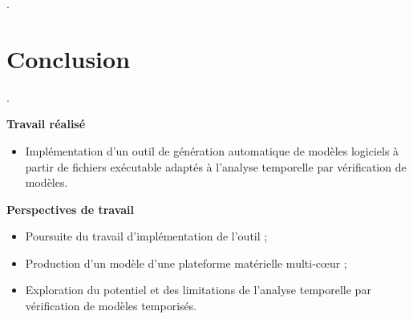 \documentclass[final]{beamer}
\begin{document}
\begin{frame}
\begin{textblock}{39}
\begin{block}{\thesection. \secname}
        \vspace{.4em}
      \end{block}
      \vspace{1em}
      
      \section{Conclusion}
      \begin{block}{\thesection. \secname}

        \textbf{Travail réalisé}
        \begin{itemize}
          \item[] Implémentation d'un outil de génération automatique de modèles
            logiciels à partir de fichiers exécutable adaptés à l'analyse
            temporelle par vérification de modèles.
        \end{itemize}
        \vspace{1em}
        
        \textbf{Perspectives de travail}
        \begin{itemize}
          \item Poursuite du travail d'implémentation de
            l'outil ;
          \item Production d'un modèle d'une plateforme matérielle
            multi-c{\oe}ur ;
          \item Exploration du potentiel et des limitations de l'analyse
            temporelle par vérification de modèles temporisés.
        \end{itemize}
        \vspace{.4em}
      \end{block}
    \end{textblock}

    
  \end{frame}
\end{document}
